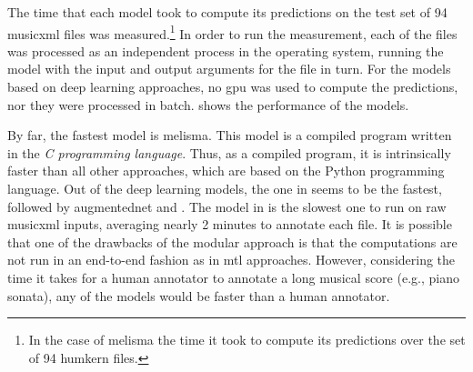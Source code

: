 
The time that each model took to compute its predictions on
the test set of 94 \gls{musicxml} files was
measured.\footnote{In the case of \gls{melisma} the time it
took to compute its predictions over the set of 94
\gls{humkern} files.} In order to run the measurement, each
of the files was processed as an independent process in the
operating system, running the model with the input and
output arguments for the file in turn. For the models based
on deep learning approaches, no \gls{gpu} was used to
compute the predictions, nor they were processed in batch.
 shows the performance of the
models.


By far, the fastest model is \gls{melisma}. This model is a
compiled program written in the \emph{C programming
language}. Thus, as a compiled program, it is intrinsically
faster than all other approaches, which are based on the
Python programming language. Out of the deep learning
models, the one in \textcite{micchi2021deep} seems to be the
fastest, followed by \gls{augmentednet} and
\textcite{chen2021attend}. The model in
\textcite{mcleod2021modular} is the slowest one to run on
raw \gls{musicxml} inputs, averaging nearly 2 minutes to
annotate each file. It is possible that one of the drawbacks
of the modular approach is that the computations are not run
in an end-to-end fashion as in \gls{mtl} approaches.
However, considering the time it takes for a human annotator
to annotate a long musical score (e.g., piano sonata), any
of the models would be faster than a human annotator.
